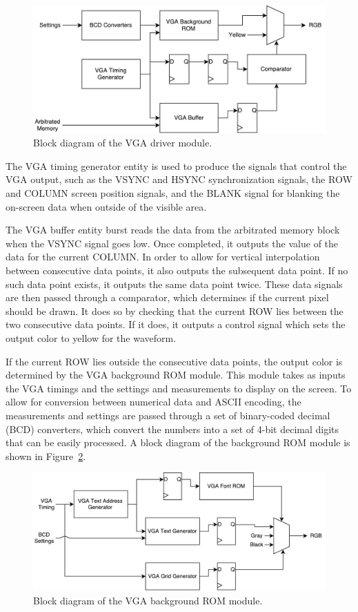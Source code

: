 \documentclass[journal]{IEEEtran}
\begin{document}
\begin{figure}[!htb]
  \centering
  \includegraphics[width=\columnwidth]{diagrams/vga_driver.pdf}
  \caption{Block diagram of the VGA driver module.}
  \label{fig:vga_driver}
\end{figure}

The VGA timing generator entity is used to produce the signals that control the VGA output, such as the VSYNC and HSYNC synchronization signals, the ROW and COLUMN screen position signals, and the BLANK signal for blanking the on-screen data when outside of the visible area.

The VGA buffer entity burst reads the data from the arbitrated memory block when the VSYNC signal goes low. Once completed, it outputs the value of the data for the current COLUMN. In order to allow for vertical interpolation between consecutive data points, it also outputs the subsequent data point. If no such data point exists, it outputs the same data point twice.
These data signals are then passed through a comparator, which determines if the current pixel should be drawn. It does so by checking that the current ROW lies between the two consecutive data points. If it does, it outputs a control signal which sets the output color to yellow for the waveform.

If the current ROW lies outside the consecutive data points, the output color is determined by the VGA background ROM module. This module takes as inputs the VGA timings and the settings and measurements to display on the screen. To allow for conversion between numerical data and ASCII encoding, the measurements and settings are passed through a set of binary-coded decimal (BCD) converters, which convert the numbers into a set of 4-bit decimal digits that can be easily processed. A block diagram of the background ROM module is shown in Figure~\ref{fig:vga_rom}.

\begin{figure}[!htb]
  \centering
  \includegraphics[width=\columnwidth]{diagrams/vga_rom.pdf}
  \caption{Block diagram of the VGA background ROM module.}
  \label{fig:vga_rom}
\end{figure}
\end{document}
